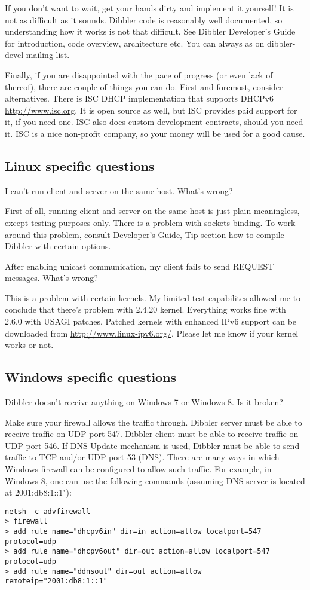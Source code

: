 If you don't want to wait, get your hands dirty and implement it
yourself! It is not as difficult as it sounds. Dibbler code is
reasonably well documented, so understanding how it works is not that
difficult. See Dibbler Developer's Guide for introduction, code
overview, architecture etc. You can always as on dibbler-devel mailing
list.

Finally, if you are disappointed with the pace of progress (or even
lack of thereof), there are couple of things you can do. First and
foremost, consider alternatives. There is ISC DHCP implementation that
supports DHCPv6 \href{http://www.isc.org/software/dhcp}{http://www.isc.org}.
It is open source as well, but ISC provides paid support for it, if
you need one. ISC also does custom development contracts, should you
need it. ISC is a nice non-profit company, so your money will be used
for a good cause.

\subsection{Linux specific questions}

\Q I can't run client and server on the same host. What's wrong?

\A First of all, running client and server on the same host is just
plain meaningless, except testing purposes only. There is a problem
with sockets binding. To work around this problem, consult Developer's
Guide, Tip section how to compile Dibbler with certain options.

\Q After enabling unicast communication, my client fails to send
REQUEST messages. What's wrong?

\A This is a problem with certain kernels. My limited test capabilites
allowed me to conclude that there's problem with 2.4.20
kernel. Everything works fine with 2.6.0 with USAGI patches. Patched
kernels with enhanced IPv6 support can be downloaded from
\url{http://www.linux-ipv6.org/}. Please let me know if your kernel
works or not.

\subsection{Windows specific questions}

\Q Dibbler doesn't receive anything on Windows 7 or Windows 8. Is it
broken?

\A Make sure your firewall allows the traffic through. Dibbler server
must be able to receive traffic on UDP port 547. Dibbler client must
be able to receive traffic on UDP port 546. If DNS Update mechanism is
used, Dibbler must be able to send traffic to TCP and/or UDP port 53
(DNS). There are many ways in which Windows firewall can be configured
to allow such traffic. For example, in Windows 8, one can use the
following commands (assuming DNS server is located at 2001:db8:1::1"):
\begin{lstlisting}
netsh -c advfirewall
> firewall
> add rule name="dhcpv6in" dir=in action=allow localport=547 protocol=udp
> add rule name="dhcpv6out" dir=out action=allow localport=547 protocol=udp
> add rule name="ddnsout" dir=out action=allow remoteip="2001:db8:1::1"
\end{lstlisting}

